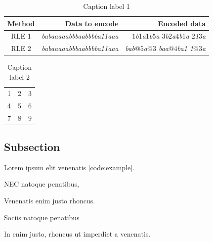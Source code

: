 \begin{table}
   \centering
   \begin{tabular}{|c|r|r|}
      \hline \textbf{Method} & \textbf{Data to encode}          & \textbf{Encoded data}                               \\\hline
      RLE 1                  & \textit{babaaaaabbbaabbbba11aaa} & \textit{$1$b$1$a$1$b$5$a $3$b$2$a$4$b$1$a $2$1$3$a} \\\hline
      RLE 2                  & \textit{babaaaaabbbaabbbba11aaa} & \textit{bab$@5$a$@3$ baa$@4$ba1 1$@3$a}             \\\hline
   \end{tabular}
   \caption[List label 1]{Caption label 1}\label{tab:example1}
\end{table}

\begin{table}
   \centering
   \begin{tabular}{| l | c r |}
      \hline
      1 & 2 & 3 \\
      4 & 5 & 6 \\
      7 & 8 & 9 \\
      \hline
   \end{tabular}
   \caption[List label 2]{Caption label 2}\label{tab:example2}
\end{table}



\subsection{Subsection}
Lorem ipsum elit venenatis \ref{code:example}.

\begin{dl}
   \item[NEC] natoque penatibus,
   \item[Venenatis] enim justo rhoncus.
\end{dl}

\begin{ol}
   \item {Sociis natoque penatibus}
\end{ol}

\begin{ul}
   \item In enim justo, rhoncus ut imperdiet a venenatis.
\end{ul}

